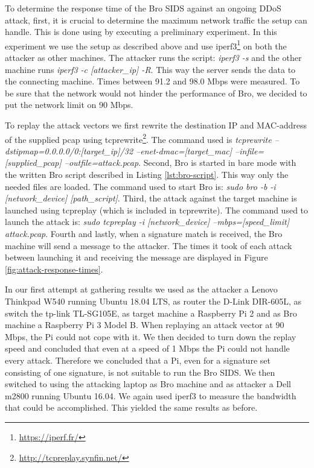 
To determine the response time of the Bro SIDS against an ongoing DDoS attack, first, it is crucial to determine the maximum network traffic the setup can handle. This is done using by executing a preliminary experiment. In this experiment we use the setup as described above and use iperf3\footnote{\url{https://iperf.fr/}} on both the attacker as other machines.  The attacker runs the script: \emph{iperf3 -s} and the other machine runs \emph{iperf3 -c [attacker\_ip] -R}. This way the server sends the data to the connecting machine. Times between 91.2 and 98.0 Mbps were measured. To be sure that the network would not hinder the performance of Bro, we decided to put the network limit on 90 Mbps. 

\begin{sloppypar}
To replay the attack vectors we first rewrite the destination IP and MAC-address of the supplied pcap using tcprewrite\footnote{\url{http://tcpreplay.synfin.net/}}. The command used is \emph{tcprewrite --dstipmap=0.0.0.0/0:[target\_ip]/32 --enet-dmac=[target\_mac] --infile=[supplied\_pcap] --outfile=attack.pcap}. Second, Bro is started in bare mode with the written Bro script described in Listing \ref{lst:bro-script}. This way only the needed files are loaded. The command used to start Bro is: \emph{sudo bro -b -i [network\_device] [path\_script]}. Third, the attack against the target machine is launched using tcpreplay (which is included in tcprewrite). The command used to launch the attack is: \emph{sudo tcpreplay -i [network\_device] --mbps=[speed\_limit] attack.pcap}. Fourth and lastly, when a signature match is received, the Bro machine will send a message to the attacker. The times it took of each attack between launching it and receiving the message are displayed in Figure \ref{fig:attack-response-times}.
\end{sloppypar}

In our first attempt at gathering results we used as the attacker a Lenovo Thinkpad W540 running Ubuntu 18.04 LTS, as router the D-Link DIR-605L, as switch the tp-link TL-SG105E, as target machine a Raspberry Pi 2 and as Bro machine a Raspberry Pi 3 Model B. When replaying an attack vector at 90 Mbps, the Pi could not cope with it. We then decided to turn down the replay speed and concluded that even at a speed of 1 Mbps the Pi could not handle every attack. Therefore we concluded that a Pi, even for a signature set consisting of one signature, is not suitable to run the Bro SIDS. We then switched to using the attacking laptop as Bro machine and as attacker a Dell m2800 running Ubuntu 16.04. We again used iperf3 to measure the bandwidth that could be accomplished. This yielded the same results as before.



